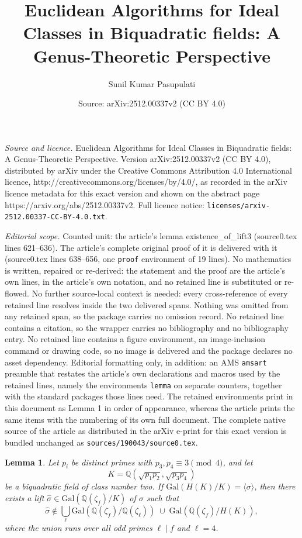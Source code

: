 \documentclass[10pt,a4paper]{amsart}
\title{Euclidean Algorithms for Ideal Classes in Biquadratic fields: A Genus-Theoretic Perspective}
\author{Sunil Kumar Pasupulati}
\date{Source: arXiv:2512.00337v2 (CC BY 4.0)}
\newtheorem{lemma}{Lemma}
\newcommand\Gal{{\mathrm {Gal}}}
\newcommand{\Q}{\mathbb{Q}}
\begin{document}
\maketitle

\noindent\emph{Source and licence.} Euclidean Algorithms for Ideal Classes in Biquadratic fields: A Genus-Theoretic Perspective. Version arXiv:2512.00337v2 (CC BY 4.0), distributed by arXiv under the Creative Commons Attribution 4.0 International licence, http://creativecommons.org/licenses/by/4.0/, as recorded in the arXiv licence metadata for this exact version and shown on the abstract page https://arxiv.org/abs/2512.00337v2. Full licence notice: \texttt{licenses/arxiv-2512.00337-CC-BY-4.0.txt}.\par\smallskip

\noindent\textit{Editorial scope.} Counted unit: the article's lemma existence\_of\_lift3 (source0.tex lines 621--636). The article's complete original proof of it is delivered with it (source0.tex lines 638--656, one \texttt{proof} environment of 19 lines). No mathematics is written, repaired or re-derived: the statement and the proof are the article's own lines, in the article's own notation, and no retained line is substituted or re-flowed.  No further source-local context is needed: every cross-reference of every retained line resolves inside the two delivered spans.  Nothing was omitted from any retained span, so the package carries no omission record.  No retained line contains a citation, so the wrapper carries no bibliography and no bibliography entry.  No retained line contains a figure environment, an image-inclusion command or drawing code, so no image is delivered and the package declares no asset dependency.  Editorial formatting only, in addition: an AMS \texttt{amsart} preamble that restates the article's own declarations and macros used by the retained lines, namely the environments \texttt{lemma} on separate counters, together with the standard packages those lines need.  The retained environments print in this document as Lemma 1 in order of appearance, whereas the article prints the same items with the numbering of its own full document.  The complete native source of the article as distributed in the arXiv e-print for this exact version is bundled unchanged as \texttt{sources/190043/source0.tex}.
\begin{lemma}\label{existence_of_lift3}
Let $p_i$ be distinct primes with $p_3,p_4\equiv3\pmod4$, and let
\[
K=\Q(\sqrt{p_1p_2},\sqrt{p_3p_4})
\]
be a biquadratic field of class number two.  
If $\Gal(H(K)/K)=\langle\sigma\rangle$, then there exists a lift
$\hat{\sigma}\in\Gal(\Q(\zeta_f)/K)$ of $\sigma$ such that
\[
\hat{\sigma}\notin 
\bigcup_{\ell} \Gal(\Q(\zeta_f)/\Q(\zeta_\ell))
\;\cup\;
\Gal(\Q(\zeta_f)/H(K)),
\]
where the union runs over all odd primes $\ell\mid f$ and $\ell=4$.
\end{lemma}
\end{document}
